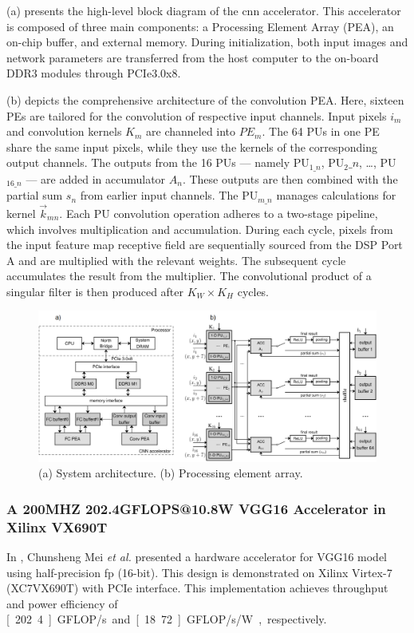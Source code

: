 (a) presents the high-level block diagram of the \gls{cnn} accelerator. This accelerator is composed of three main components: a Processing Element Array (PEA), an on-chip buffer, and external memory. During initialization, both input images and network parameters are transferred from the host computer to the on-board DDR3 modules through PCIe3.0x8.

(b) depicts the comprehensive architecture of the convolution PEA. Here, sixteen PEs are tailored for the convolution of respective input channels. Input pixels \(i_m\) and convolution kernels \(K_m\) are channeled into \(PE_m\). The 64 PUs in one PE share the same input pixels, while they use the kernels of the corresponding output channels. The outputs from the 16 PUs --- namely PU\(_{1\_n}\), PU\(_2\_n\), \ldots, PU\(_{16\_n}\) --- are added in accumulator \(A_n\). These outputs are then combined with the partial sum \(s_n\) from earlier input channels. The PU\(_{m\_n}\) manages calculations for kernel \(\vec{k}_{mn}\). Each PU convolution operation adheres to a two-stage pipeline, which involves multiplication and accumulation. During each cycle, pixels from the input feature map receptive field are sequentially sourced from the DSP Port A and are multiplied with the relevant weights. The subsequent cycle accumulates the result from the multiplier. The convolutional product of a singular filter is then produced after \(K_W \times K_H\) cycles.


\begin{figure}[h!]
	\centering
	\includegraphics[width=\textwidth]{./figures/3_g.png}
	\caption{(a) System architecture. (b) Processing element array.}
	\label{fig:lian2019high}
\end{figure}
\FloatBarrier

\subsubsection{A 200MHZ 202.4GFLOPS@10.8W VGG16 Accelerator in Xilinx VX690T}
In \cite{mei2017200mhz}, Chunsheng Mei \textit{et al.} presented a hardware accelerator for VGG16 model using half-precision \gls{fp} (16-bit). This design is demonstrated on Xilinx Virtex-7 (XC7VX690T) with PCIe interface. This implementation achieves throughput and power efficiency of \unit[202.4]{GFLOP/s} and \unit[18.72]{GFLOP/s/W}, respectively.


